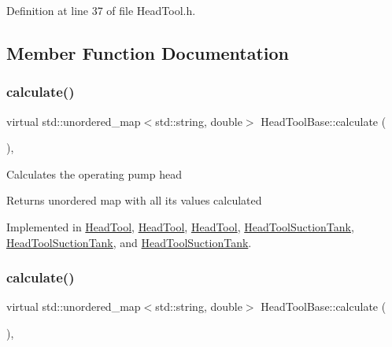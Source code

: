 Definition at line 37 of file Head\+Tool.\+h.



\subsection{Member Function Documentation}
\mbox{\label{class_head_tool_base_ab8df8f908827ce45dc5e769ea0e10f0b}} 
\subsubsection{\texorpdfstring{calculate()}{calculate()}\hspace{0.1cm}{\footnotesize\ttfamily [1/3]}}
{\footnotesize\ttfamily virtual std\+::unordered\+\_\+map$<$std\+::string, double$>$ Head\+Tool\+Base\+::calculate (\begin{DoxyParamCaption}{ }\end{DoxyParamCaption})\hspace{0.3cm}{\ttfamily [protected]}, {}}

Calculates the operating pump head

\begin{DoxyReturn}{Returns}
unordered map with all its values calculated 
\end{DoxyReturn}


Implemented in \hyperlink{class_head_tool_ab107e7717df4ca95404ce1952c21a84e}{Head\+Tool}, \hyperlink{class_head_tool_a146eaf45d39cf6d691fa10b4b80b5e9e}{Head\+Tool}, \hyperlink{class_head_tool_a146eaf45d39cf6d691fa10b4b80b5e9e}{Head\+Tool}, \hyperlink{class_head_tool_suction_tank_a390a38466222aa3b87d2cf2ec84537a5}{Head\+Tool\+Suction\+Tank}, \hyperlink{class_head_tool_suction_tank_a7e4a6931caa7c9be43992aecdfb80bec}{Head\+Tool\+Suction\+Tank}, and \hyperlink{class_head_tool_suction_tank_a7e4a6931caa7c9be43992aecdfb80bec}{Head\+Tool\+Suction\+Tank}.

\mbox{\label{class_head_tool_base_ab8df8f908827ce45dc5e769ea0e10f0b}} 
\subsubsection{\texorpdfstring{calculate()}{calculate()}\hspace{0.1cm}{\footnotesize\ttfamily [2/3]}}
{\footnotesize\ttfamily virtual std\+::unordered\+\_\+map$<$std\+::string, double$>$ Head\+Tool\+Base\+::calculate (\begin{DoxyParamCaption}{ }\end{DoxyParamCaption})\hspace{0.3cm}{\ttfamily [protected]}, {}}

